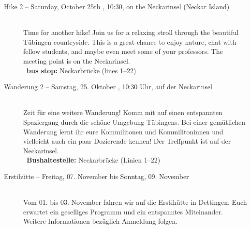 \begin{description}
\ifml
	\item[Hike 2 -- Saturday, October 25th \YEAR, 10:30, on the Neckarinsel (Neckar Island)]~\\
	Time for another hike! Join us for a relaxing stroll through the beautiful Tübingen countryside.
	This is a great chance to enjoy nature, chat with fellow students, and maybe even meet some of your professors.
	The meeting point is on the Neckarinsel.\\
	~\textbf{bus stop:} Neckarbrücke (lines 1--22)
\else
	\item[Wanderung 2 -- Samstag, 25. Oktober \YEAR, 10:30 Uhr, auf der Neckarinsel]~\\
	Zeit für eine weitere Wanderung! Komm mit auf einen entspannten Spaziergang durch die schöne Umgebung Tübingens.
	Bei einer gemütlichen Wanderung lernt ihr eure Kommilitonen und Kommilitoninnen
	und vielleicht auch ein paar Dozierende kennen!
	Der Treffpunkt ist auf der Neckarinsel.\\
	~\textbf{Bushaltestelle:} Neckarbrücke (Linien 1--22)
\fi



\ifml
\else
   \item[Erstihütte -- Freitag, 07. November bis Sonntag, 09. November \YEAR]~\\
   Vom 01. bis 03. November fahren wir auf die Erstihütte in Dettingen.
   Euch erwartet ein geselliges Programm und ein entspanntes Miteinander.
   Weitere Informationen bezüglich Anmeldung folgen.
\fi


\end{description}
